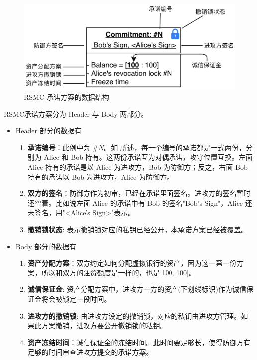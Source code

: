 \begin{figure}[h!]
    \centering
    \includegraphics[width=12cm, keepaspectratio]{../images/RSMC.png}
    \caption{RSMC 承诺方案的数据结构}
    \label{fig:rsmc}
\end{figure}

RSMC承诺方案分为 Header 与 Body 两部分。
\begin{itemize}
    \item Header 部分的数据有
        \begin{enumerate}
            \item \textbf{承诺编号}：此例中为 \#$N$。如 所述，每一个编号的承诺都是一式两份，分别为 Alice 和 Bob 持有。这两份承诺互为对偶承诺，攻守位置互换。左面Alice 持有的承诺是以 Alice 为进攻方，Bob 为防御方；反之，右面 Bob 持有的承诺以 Bob 为进攻方，Alice 为防御方。
            \item \textbf{双方的签名}：防御方作为初审，已经在承诺里面签名。进攻方的签名暂时还空着。比如说左面 Alice 的承诺中有 Bob 的签名"Bob's Sign"，Alice 还未签名，用"<Alice's Sign>"表示。
            \item \textbf{撤销锁状态}: 表示撤销锁对应的私钥已经公开，本承诺方案已经被覆盖。
        \end{enumerate}
        
    \item Body 部分的数据有
        \begin{enumerate}
            \item \textbf{资产分配方案}：双方约定如何分配虚拟银行的资产，因为这一第一份方案，所以和双方的注资额度是一样的，也是[100, 100]。
            \item \textbf{诚信保证金}: 资产分配方案中，进攻方一方的资产(下划线标识)作为诚信保证金将会被锁定一段时间。
            \item \textbf{进攻方的撤销锁}: 由进攻方设定的撤销锁，对应的私钥由进攻方管理。如果此方案撤销，进攻方要公开撤销锁的私钥。
            \item \textbf{资产冻结时间}：诚信保证金的冻结时间。此时间要足够长，使得防御方有足够的时间审查进攻方提交的承诺方案。
        \end{enumerate}
\end{itemize}

